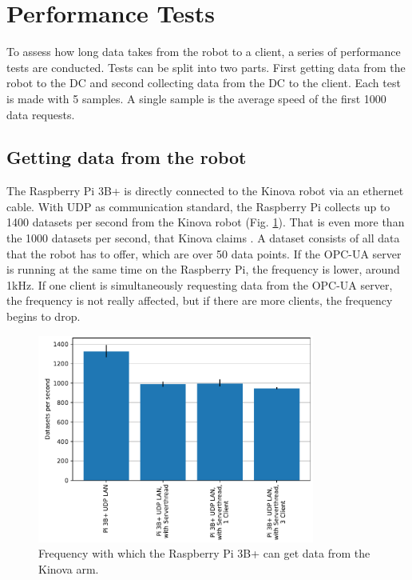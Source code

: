\documentclass[conference]{IEEEtran}
\begin{document}
\section{Performance Tests}
To assess how long data takes from the robot to a client, a series of performance tests are conducted.
Tests can be split into two parts. 
First getting  data from the robot to the DC and second collecting  data from the DC to the client.
Each test is made with 5 samples. A single sample is the average speed of the first 1000 data requests.
\subsection{Getting data from the robot}
The Raspberry Pi 3B+ is directly connected to the Kinova robot via an ethernet cable.
With UDP as communication standard, the Raspberry Pi collects  up to 1400 datasets per second from the Kinova robot (Fig. \ref{fig:KortexAPISpeed}).
That is even more than the 1000 datasets per second, that Kinova claims \cite{KortexUDP}. A dataset consists of all  data that the robot has to offer, which are over 50 data points.
If the OPC-UA server is running at the same time on the Raspberry Pi, the frequency is lower, around 1kHz.
If one client is simultaneously requesting data from the OPC-UA server, the frequency is not really affected, but if there are more clients, the frequency begins to drop.

\begin{figure}[htbp]
    \centerline{\includegraphics[width=9.1cm]{Pictures/KortexAPISpeed.pdf}}
    \caption{Frequency with which the Raspberry Pi 3B+ can get data from the Kinova arm.}
    \label{fig:KortexAPISpeed}
\end{figure}
\end{document}

